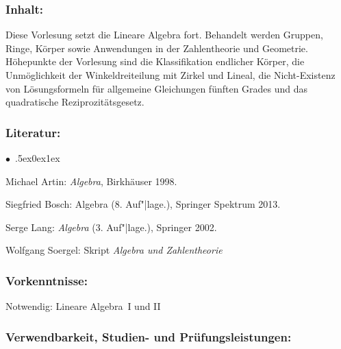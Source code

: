 \documentclass[a4paper,10pt]{article}
\renewenvironment{itemize}{\begin{list}{$\bullet$\ }{\itemsep.5ex\setlength{\topsep}{0.5\itemsep}\parsep0ex\labelsep1ex\settowidth{\labelwidth}{$\bullet$\ }\setlength{\leftmargin}{\labelwidth}\addtolength{\leftmargin}{3ex}\addtolength{\leftmargin}{\labelsep}}}{\end{list}}
\begin{document}
\subsubsection*{\large
    Inhalt:
}
Diese Vorlesung setzt die Lineare Algebra fort. Behandelt werden Gruppen, Ringe, Körper sowie Anwendungen in der Zahlentheorie und Geometrie. Höhepunkte der Vorlesung sind die Klassifikation endlicher Körper, die Unmöglichkeit der Winkeldreiteilung mit Zirkel und Lineal, die Nicht-Existenz von Lösungsformeln für allgemeine Gleichungen fünften Grades und das quadratische Reziprozitätsgesetz.
\subsubsection*{\large
    Literatur:
}
\begin{itemize}
\item Michael Artin: \emph{Algebra}, Birkhäuser 1998.
\item Siegfried Bosch: Algebra (8. Auf"|lage.), Springer Spektrum 2013.
\item Serge Lang: \emph{Algebra} (3. Auf"|lage.), Springer 2002.
\item Wolfgang Soergel: Skript \emph{Algebra und Zahlentheorie}
\end{itemize}
\subsubsection*{\large
    Vorkenntnisse:
}
Notwendig: Lineare Algebra~I und II
\cleardoublepage
\subsubsection*{\large
    Verwendbarkeit, Studien- und Prüfungsleistungen:
}
\end{document}
